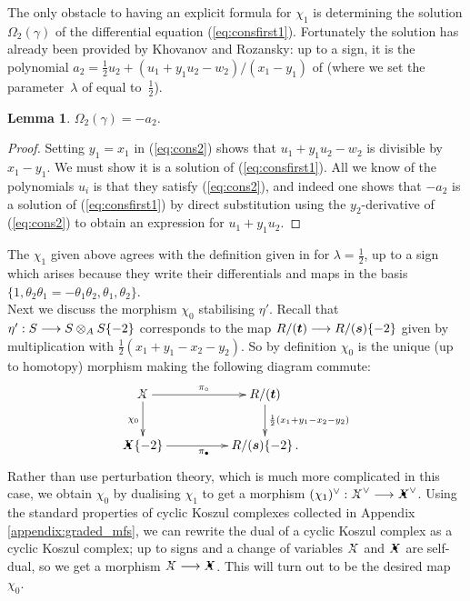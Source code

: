 \documentclass{compositio}
\newtheorem{lemma}[theorem]{Lemma}
\theoremstyle{definition}
\numberwithin{equation}{section}
\begin{document}
The only obstacle to having an explicit formula for $\chi_1$ is determining the solution $\Omega_2(\gamma)$ of the differential equation (\ref{eq:consfirst1}). Fortunately the solution has already been provided by Khovanov and Rozansky: up to a sign, it is the polynomial $a_2 = \frac{1}{2}u_2 + (u_1 + y_1 u_2 - w_2)/(x_1-y_1)$ of \cite[p.51]{kr0401268} (where we set the parameter~$\lambda$ of \cite{kr0401268} equal to~$\frac{1}{2}$).

\begin{lemma} $\Omega_2(\gamma) = -a_2$.
\end{lemma}
\begin{proof}
Setting $y_1 = x_1$ in (\ref{eq:cons2}) shows that $u_1 + y_1 u_2 - w_2$ is divisible by $x_1 - y_1$. We must show it is a solution of (\ref{eq:consfirst1}). All we know of the polynomials $u_i$ is that they satisfy (\ref{eq:cons2}), and indeed one shows that $-a_2$ is a solution of (\ref{eq:consfirst1}) by direct substitution using the $y_2$-derivative of (\ref{eq:cons2}) to obtain an expression for $u_1 + y_1 u_2$.
\end{proof}

The $\chi_1$ given above agrees with the definition given in \cite[p.51]{kr0401268} for $\lambda = \frac{1}{2}$, up to a sign which arises because they write their differentials and maps in the basis $\{1, \theta_2 \theta_1 = - \theta_1 \theta_2, \theta_1, \theta_2\}$.
\\

Next we discuss the morphism $\chi_0$ stabilising $\eta'$. Recall that $\eta': S \longrightarrow S \otimes_A S\{-2\}$ corresponds to the map $R/(\boldsymbol{t}) \longrightarrow R/(\boldsymbol{s})\{-2\}$ given by multiplication with $\frac{1}{2}(x_1 + y_1 - x_2 - y_2)$. So by definition $\chi_0$ is the unique (up to homotopy) morphism making the following diagram commute:
\begin{equation}\label{eq:cons50}
\xymatrix@C+2pc{
\Xcirc \ar[d]_{\chi_0} \ar[r]^{\pi_{\circ}} & R/(\boldsymbol{t}) \ar[d]^-{\frac{1}{2}(x_1+y_1-x_2-y_2)}\\
\Xbul\{-2\} \ar[r]_{\pi_{\bullet}} & R/(\boldsymbol{s})\{-2\} \, .
}
\end{equation}
Rather than use perturbation theory, which is much more complicated in this case, we obtain $\chi_0$ by dualising $\chi_1$ to get a morphism $(\chi_1)\mdual: \Xcirc\mdual \lto \Xbul\mdual$. Using the standard properties of cyclic Koszul complexes collected in Appendix \ref{appendix:graded_mfs}, we can rewrite the dual of a cyclic Koszul complex as a cyclic Koszul complex; up to signs and a change of variables $\Xcirc$ and $\Xbul$ are self-dual, so we get a morphism $\Xcirc \lto \Xbul$. This will turn out to be the desired map $\chi_0$.
\end{document}

